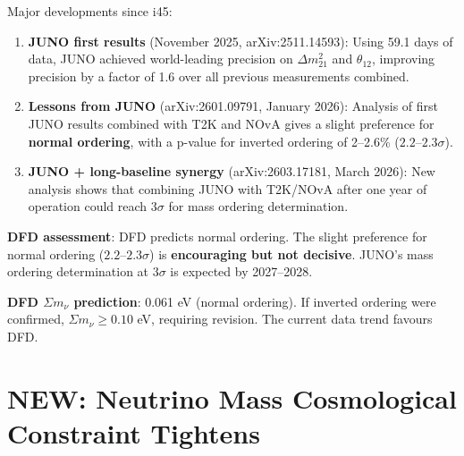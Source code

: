 \documentclass[11pt,a4paper]{article}
\newcommand{\NEW}{\textcolor{dfdblue}{\textbf{NEW}}}
\begin{document}
\begin{tcolorbox}[colback=blue!5!white, colframe=blue!60!black,
  title={JUNO First Results + T2K/NOvA: Normal Ordering Slightly Preferred}]

Major developments since i45:

\begin{enumerate}
\item \textbf{JUNO first results} (November 2025, arXiv:2511.14593): Using 59.1 days of data, JUNO achieved world-leading precision on $\Delta m^2_{21}$ and $\theta_{12}$, improving precision by a factor of 1.6 over all previous measurements combined.

\item \textbf{Lessons from JUNO} (arXiv:2601.09791, January 2026): Analysis of first JUNO results combined with T2K and NOvA gives a slight preference for \textbf{normal ordering}, with a p-value for inverted ordering of 2--2.6\% ($2.2$--$2.3\sigma$).

\item \textbf{JUNO + long-baseline synergy} (arXiv:2603.17181, March 2026): New analysis shows that combining JUNO with T2K/NOvA after one year of operation could reach $3\sigma$ for mass ordering determination.
\end{enumerate}

\textbf{DFD assessment}: DFD predicts normal ordering. The slight preference for normal ordering ($2.2$--$2.3\sigma$) is \textbf{encouraging but not decisive}. JUNO's mass ordering determination at $3\sigma$ is expected by 2027--2028.

\textbf{DFD $\Sigma m_\nu$ prediction}: 0.061 eV (normal ordering). If inverted ordering were confirmed, $\Sigma m_\nu \geq 0.10$ eV, requiring revision. The current data trend favours DFD.
\end{tcolorbox}

\section{\NEW: Neutrino Mass Cosmological Constraint Tightens}
\end{document}
